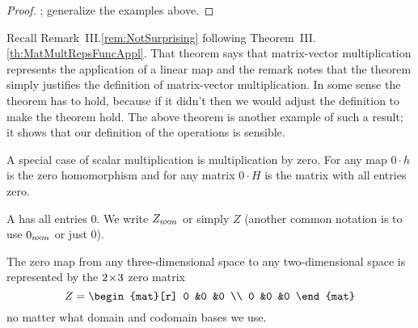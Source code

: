 \begin{proof}
; generalize the examples above.
\end{proof}

\begin{remark}
Recall Remark~III.\ref{rem:NotSurprising} following 
Theorem~III.\ref{th:MatMultRepsFuncAppl}.
That theorem says that matrix-vector 
multiplication represents the application of a linear map and
the remark notes that the theorem
simply justifies the definition of matrix-vector multiplication.
In some sense the theorem has to hold, because if it didn't then we
would adjust the definition to make the theorem hold.
The above theorem is another example of such a result; it shows that
our definition of the operations is sensible.
\end{remark}

A special case of scalar multiplication is multiplication by zero.
For any map $0\cdot h$ is the zero homomorphism and for any matrix
$0\cdot H$ is the matrix with all entries zero.

\begin{definition}
A  %
has all entries $0$.
We write $Z_{n \! \times \! m}$ or simply $Z$
(another common notation is to use $0_{n \! \times \! m}$ or just $0$).
\end{definition}

\begin{example}
The zero map from any three-dimensional space to any two-dimensional space
is represented by the \( 2 \! \times \! 3 \) zero matrix
\begin{equation*}
   Z=\begin{mat}[r]
     0  &0  &0  \\
     0  &0  &0
   \end{mat}
\end{equation*}
no matter what domain and codomain bases we use.
\end{example}



